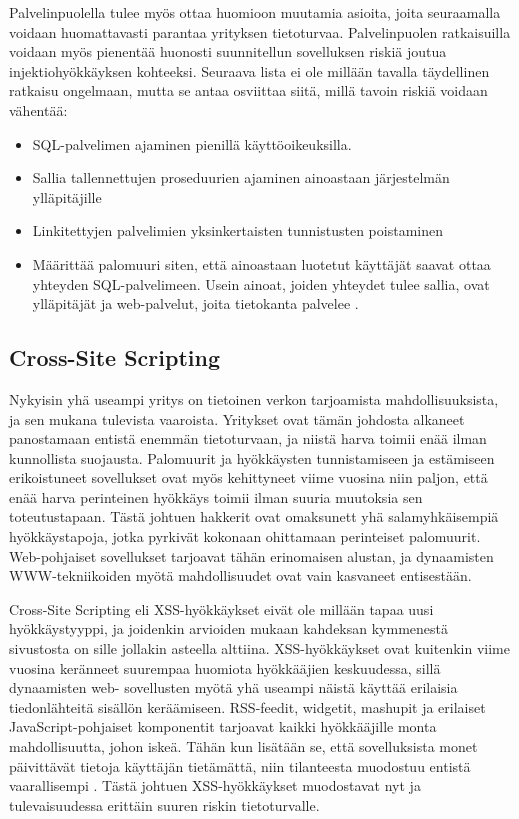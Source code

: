 Palvelinpuolella tulee myös ottaa huomioon muutamia asioita, joita seuraamalla voidaan huomattavasti parantaa yrityksen tietoturvaa.
Palvelinpuolen ratkaisuilla voidaan myös pienentää huonosti suunnitellun sovelluksen riskiä joutua injektiohyökkäyksen kohteeksi. 
Seuraava lista ei ole millään tavalla täydellinen ratkaisu ongelmaan, mutta se antaa osviittaa siitä, millä tavoin riskiä voidaan vähentää:

\begin{itemize}
\item SQL-palvelimen ajaminen pienillä käyttöoikeuksilla.
\item Sallia tallennettujen proseduurien ajaminen ainoastaan järjestelmän ylläpitäjille
\item Linkitettyjen palvelimien yksinkertaisten tunnistusten poistaminen
\item Määrittää palomuuri siten, että ainoastaan luotetut käyttäjät saavat ottaa yhteyden SQL-palvelimeen. Usein ainoat, joiden yhteydet 
      tulee sallia, ovat ylläpitäjät ja web-palvelut, joita tietokanta palvelee \cite{SQLSS}.
\end{itemize}

\subsection{Cross-Site Scripting}
Nykyisin yhä useampi yritys on tietoinen verkon tarjoamista mahdollisuuksista, ja sen mukana tulevista vaaroista. Yritykset ovat tämän johdosta
alkaneet panostamaan entistä enemmän tietoturvaan, ja niistä harva toimii enää ilman kunnollista suojausta. Palomuurit ja hyökkäysten tunnistamiseen
ja estämiseen erikoistuneet sovellukset ovat myös kehittyneet viime vuosina niin paljon, että enää harva perinteinen hyökkäys toimii ilman
suuria muutoksia sen toteutustapaan. Tästä johtuen hakkerit ovat omaksunett  yhä salamyhkäisempiä hyökkäystapoja, jotka pyrkivät kokonaan
ohittamaan perinteiset palomuurit. Web-pohjaiset sovellukset tarjoavat tähän erinomaisen alustan, ja dynaamisten WWW-tekniikoiden myötä mahdollisuudet 
ovat vain kasvaneet entisestään.

Cross-Site Scripting eli XSS-hyökkäykset eivät ole millään tapaa uusi hyökkäystyyppi, ja joidenkin arvioiden mukaan kahdeksan kymmenestä sivustosta on 
sille jollakin asteella alttiina. XSS-hyökkäykset ovat kuitenkin viime vuosina keränneet suurempaa huomiota hyökkääjien keskuudessa, sillä dynaamisten web- sovellusten
myötä yhä useampi näistä käyttää erilaisia tiedonlähteitä sisällön keräämiseen. RSS-feedit, widgetit, mashupit ja erilaiset JavaScript-pohjaiset komponentit 
tarjoavat kaikki hyökkääjille monta mahdollisuutta, johon iskeä. Tähän kun lisätään se, että sovelluksista monet päivittävät tietoja käyttäjän tietämättä, 
niin tilanteesta muodostuu entistä vaarallisempi \cite{WEB2b}. Tästä johtuen XSS-hyökkäykset muodostavat nyt ja tulevaisuudessa erittäin suuren riskin
tietoturvalle.

